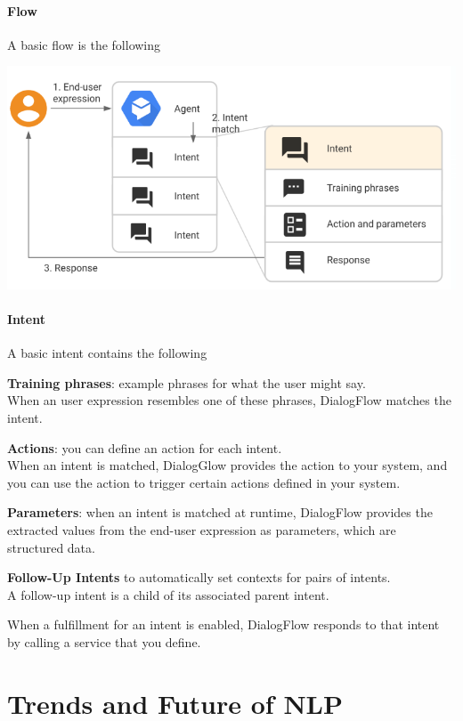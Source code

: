\documentclass[10pt]{report}
\begin{document}
\paragraph{Flow} A basic flow is the following
\begin{center}
	\includegraphics[scale=0.5]{139.png}
\end{center}
\paragraph{Intent} A basic intent contains the following
\begin{list}{}{}
	\item \textbf{Training phrases}: example phrases for what the user might say.\\
	When an user expression resembles one of these phrases, DialogFlow matches the intent.
	\item \textbf{Actions}: you can define an action for each intent.\\
	When an intent is matched, DialogGlow provides the action to your system, and you can use the action to trigger certain actions defined in your system.
	\item \textbf{Parameters}: when an intent is matched at runtime, DialogFlow provides the extracted values from the end-user expression as parameters, which are structured data.
	\item \textbf{Follow-Up Intents} to automatically set contexts for pairs of intents.\\
	A follow-up intent is a child of its associated parent intent.
\end{list}
When a fulfillment for an intent is enabled, DialogFlow responds to that intent by calling a service that you define.
\section{Trends and Future of NLP}
\end{document}

